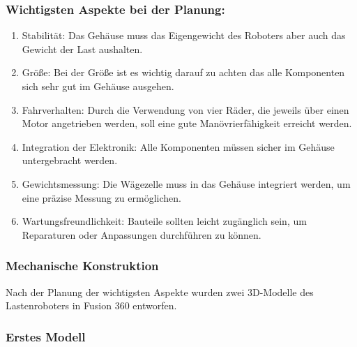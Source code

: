 \documentclass[ngerman,12pt,a4paper]{article}
\begin{document}
			\subsubsection*{Wichtigsten Aspekte bei der Planung: }
		
		\begin{enumerate}
			\item Stabilität: Das Gehäuse muss das Eigengewicht des Roboters aber auch das Gewicht der Last aushalten.
			\item Größe: Bei der Größe ist es wichtig darauf zu achten das alle Komponenten sich sehr gut im Gehäuse ausgehen.
			\item Fahrverhalten: Durch die Verwendung von vier Räder, die jeweils über einen Motor angetrieben werden, soll eine gute Manövrierfähigkeit erreicht werden.
			\item Integration der Elektronik: Alle Komponenten müssen sicher im Gehäuse untergebracht werden.
			\item Gewichtsmessung: Die Wägezelle muss in das Gehäuse integriert werden, um eine präzise Messung zu ermöglichen.
			\item Wartungsfreundlichkeit: Bauteile sollten leicht zugänglich sein, um Reparaturen oder Anpassungen durchführen zu können.			
		\end{enumerate}
		
			\subsubsection*{Mechanische Konstruktion}
			
		Nach der Planung der wichtigsten Aspekte wurden zwei 3D-Modelle des Lastenroboters in Fusion 360 entworfen.
		
		\newpage
		
			\subsubsection*{Erstes Modell} 
			
			\vspace{20pt}
			
\end{document}
